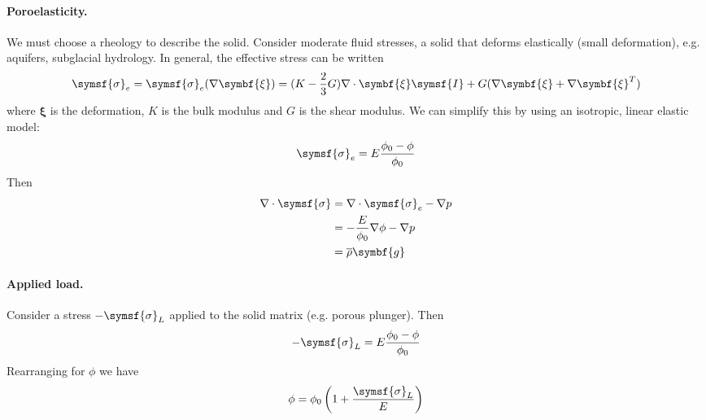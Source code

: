 \documentclass{jknotes}
\begin{document}
\paragraph{Poroelasticity.} We must choose a rheology to describe the solid.
Consider moderate fluid stresses, a solid that deforms elastically (small
deformation), e.g. aquifers, subglacial hydrology. In general, the effective
stress can be written
\begin{equation}
	\symsf{\sigma}_e = \symsf{\sigma}_e(\nabla \symbf{\xi}) = (K -
	\frac{2}{3}G)\nabla\cdot\symbf{\xi}\symsf{I} + G(\nabla \symbf{\xi} +
	\nabla \symbf{\xi}^T)
\end{equation}
where $\symbf{\xi}$ is the deformation, $K$ is the bulk modulus and $G$ is the
shear modulus. We can simplify this by using an isotropic, linear elastic
model:
\begin{equation}
	\symsf{\sigma}_e = E\frac{\phi_0 - \phi}{\phi_0}
\end{equation}
Then
\begin{align}
	\nabla \cdot \symsf{\sigma} &= \nabla \cdot \symsf{\sigma}_e - \nabla p
	\\
								&= -\frac{E}{\phi_0}\nabla \phi - \nabla p \\
								&= \overline{\rho}\symbf{g} \label{eq:l14:1}
\end{align}

\paragraph{Applied load.} Consider a stress $-\symsf{\sigma}_L$ applied to the
solid matrix (e.g. porous plunger). Then
\begin{equation}
	-\symsf{\sigma}_L = E \frac{\phi_0 - \phi}{\phi_0}
\end{equation}
Rearranging for $\phi$ we have
\begin{equation}
	\phi = \phi_0\left(1+\frac{\symsf{\sigma}_L}{E}\right)
\end{equation}
\end{document}
